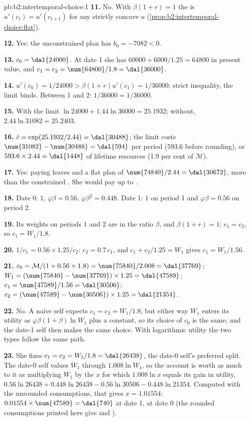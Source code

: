 \begin{solution}{pb:b2:intertemporal-choice:1}
\textbf{11.} No. With $\beta(1 + r) = 1$ the  is $u'(c_t) = u'(c_{t+1})$ for any
strictly concave $u$ (\cref{prop:b2:intertemporal-choice:flat}).

\textbf{12.} Yes: the unconstrained plan has $b_0 = -\num{7082} < 0$.

\textbf{13.} $c_0 = \dal{24000}$. At date 1 she has $\num{60000} + \num{6000}/1.25 = \num{64800}$ in
present value, and $c_1 = c_2 = \num{64800}/1.8 = \dal{36000}$.

\textbf{14.} $u'(c_0) = 1/\num{24000} > \beta(1 + r)u'(c_1) = 1/\num{36000}$: strict inequality, the
limit binds. Between 1 and 2: $1/\num{36000} = 1/\num{36000}$.

\textbf{15.} With the limit $\ln\num{24000} + 1.44\ln\num{36000} = 25.1932$; without, $2.44\ln\num{31082}
= 25.2403$.

\textbf{16.} $\bar c = \exp(25.1932/2.44) = \dal{30488}$; the limit costs $\num{31082} - \num{30488} =
\dal{594}$ per period ($593.6$ before rounding), or $593.6 \times 2.44 = \dal{1448}$ of lifetime
resources (1.9 per cent of $\mathcal{M}$).

\textbf{17.} Yes: paying  leaves  and a flat plan of $\num{74840}/2.44 =
\dal{30672}$, more than the constrained . She would pay up to .

\textbf{18.} Date 0: $1$, $\varphi\beta = 0.56$, $\varphi\beta^2 = 0.448$. Date 1: $1$ on period 1 and
$\varphi\beta = 0.56$ on period 2.

\textbf{19.} Its weights on periods 1 and 2 are in the ratio $\beta$, and $\beta(1 + r) = 1$: $c_1 =
c_2$, so $c_1 = W_1/1.8$.

\textbf{20.} $1/c_1 = 0.56 \times 1.25/c_2$: $c_2 = 0.7\,c_1$, and $c_1 + c_2/1.25 = W_1$ gives $c_1 =
W_1/1.56$.

\textbf{21.} $c_0 = \mathcal{M}/(1 + 0.56 \times 1.8) = \num{75840}/2.008 = \dal{37769}$; $W_1 =
(\num{75840} - \num{37769}) \times 1.25 = \dal{47589}$; $c_1 = \num{47589}/1.56 = \dal{30506}$; $c_2 =
(\num{47589} - \num{30506}) \times 1.25 = \dal{21354}$.

\textbf{22.} No. A naive self expects $c_1 = c_2 = W_1/1.8$, but either way $W_1$ enters its utility as
$\varphi\beta(1 + \beta)\ln W_1$ plus a constant, so its choice of $c_0$ is the same; and the date-1
self then makes the same choice. With logarithmic utility the two types follow the same path.

\textbf{23.} She fixes $c_1 = c_2 = W_1/1.8 = \dal{26438}$, the date-0 self's preferred split. The
date-0 self values $W_1$ through $1.008\ln W_1$, so the account is worth as much to it as multiplying
$W_1$ by the $x$ for which $1.008\ln x$ equals its gain in utility, $0.56\ln\num{26438} + 0.448\ln\num{26438}
- 0.56\ln\num{30506} - 0.448\ln\num{21354}$. Computed with the unrounded consumptions, that gives $x = 1.01554$: $0.01554 \times \num{47589} =
\dal{740}$ at date 1,  at date 0 (the rounded consumptions printed here give  and ).


\end{solution}
